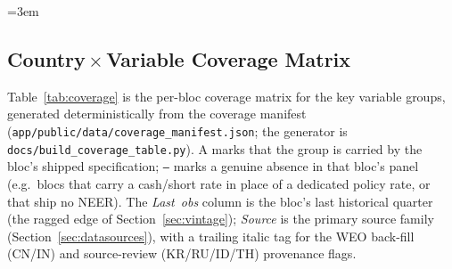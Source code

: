 \documentclass[11pt]{article}
\newcommand{\cmark}{{\color{green!55!black}\checkmark}}
\theoremstyle{definition}
\theoremstyle{remark}
\begin{document}
\begingroup
\setlength{\tabcolsep}{2.5pt}%
\emergencystretch=3em\relax
{}\relax
{}\relax

\endgroup


\subsection{Country\,$\times$\,Variable Coverage Matrix}\label{sec:coverage-matrix}

Table~\ref{tab:coverage} is the per-bloc coverage matrix for the key
variable groups, generated deterministically from the coverage manifest
(\texttt{app/public/data/coverage\_manifest.json}; the generator is
\texttt{docs/build\_coverage\_table.py}). A \cmark{} marks that the group
is carried by the bloc's shipped specification; \texttt{--} marks a genuine
absence in that bloc's panel (e.g.\ blocs that carry a cash/short rate in
place of a dedicated policy rate, or that ship no NEER). The
\emph{Last~obs} column is the bloc's last historical quarter (the ragged
edge of Section~\ref{sec:vintage}); \emph{Source} is the primary source
family (Section~\ref{sec:datasources}), with a trailing italic tag for the
WEO back-fill (CN/IN) and source-review (KR/RU/ID/TH) provenance flags.
\end{document}
